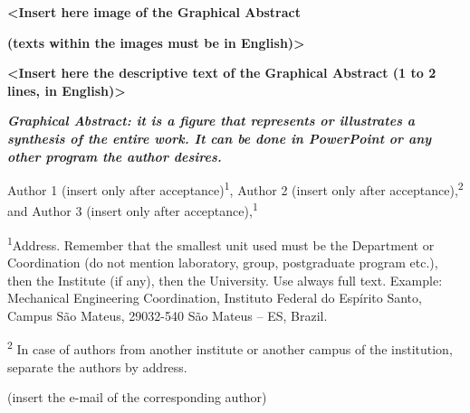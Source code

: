 \documentclass[revista,english,oneside]{ifes8}
\begin{document}
\imprimircaparevista

\begin{graphicalabstract}

\textbf{<Insert here image of the Graphical Abstract}

\textbf{(texts within the images must be in English)>}

\vspace{8mm}

\textbf{<Insert here the descriptive text of the Graphical Abstract (1 to 2 lines, in English)>}

\vspace{4mm}

\textit{\textbf{Graphical Abstract: it is a figure that represents or illustrates a
synthesis of the entire work. It can be done in PowerPoint or any other program the
author desires.}}
\end{graphicalabstract}

\imprimirtituloartigo

\noindent Author 1 (insert only after
acceptance)\textsuperscript{1}\orcid*,
Author 2 (insert only after
acceptance),\textsuperscript{2}\orcid{} and
Author 3 (insert only after acceptance),\textsuperscript{1}

\begin{OnehalfSpacing}
\noindent \textsuperscript{1}Address. Remember that the smallest unit used must be the
Department or Coordination (do not mention laboratory, group, postgraduate program
etc.), then the Institute (if any), then the University. Use always full text. Example:
Mechanical Engineering Coordination, Instituto Federal do Espírito Santo, Campus São
Mateus, 29032-540 São Mateus -- ES, Brazil.

\noindent \textsuperscript{2} In case of authors from another institute or another
campus of the institution, separate the authors by address.
\end{OnehalfSpacing}

\begin{flushright}{\fontsize{10}{12}\selectfont * (insert the e-mail of the corresponding author)}\end{flushright}

\imprimirdatasartigo

\vfill
\end{document}
